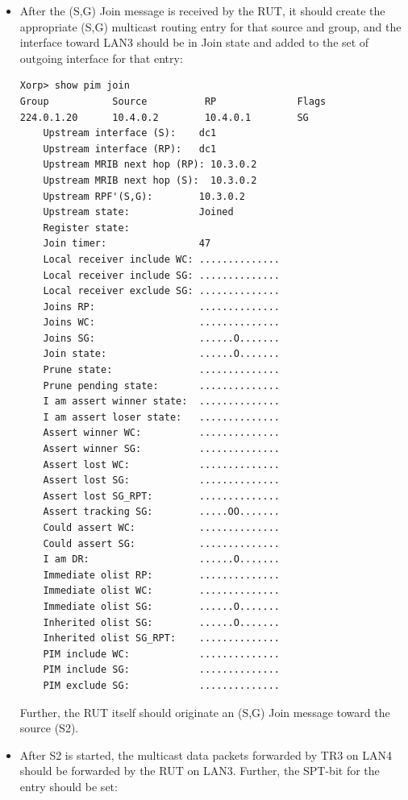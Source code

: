 \documentclass[11pt]{report}
\begin{document}
\begin{itemize}

  \item After the (S,G) Join message is received by the RUT, it
  should create the appropriate (S,G) multicast routing entry for
  that source and group, and the interface toward LAN3 should be in Join state
  and added to the set of outgoing interface for that entry:

\begin{verbatim}
Xorp> show pim join 
Group           Source          RP              Flags
224.0.1.20      10.4.0.2        10.4.0.1        SG   
    Upstream interface (S):    dc1
    Upstream interface (RP):   dc1
    Upstream MRIB next hop (RP): 10.3.0.2
    Upstream MRIB next hop (S):  10.3.0.2
    Upstream RPF'(S,G):        10.3.0.2
    Upstream state:            Joined 
    Register state:            
    Join timer:                47
    Local receiver include WC: ..............
    Local receiver include SG: ..............
    Local receiver exclude SG: ..............
    Joins RP:                  ..............
    Joins WC:                  ..............
    Joins SG:                  ......O.......
    Join state:                ......O.......
    Prune state:               ..............
    Prune pending state:       ..............
    I am assert winner state:  ..............
    I am assert loser state:   ..............
    Assert winner WC:          ..............
    Assert winner SG:          ..............
    Assert lost WC:            ..............
    Assert lost SG:            ..............
    Assert lost SG_RPT:        ..............
    Assert tracking SG:        .....OO.......
    Could assert WC:           ..............
    Could assert SG:           ..............
    I am DR:                   ......O.......
    Immediate olist RP:        ..............
    Immediate olist WC:        ..............
    Immediate olist SG:        ......O.......
    Inherited olist SG:        ......O.......
    Inherited olist SG_RPT:    ..............
    PIM include WC:            ..............
    PIM include SG:            ..............
    PIM exclude SG:            ..............
\end{verbatim}

  Further, the RUT itself should originate an (S,G) Join message
  toward the source (S2).

  \item After S2 is started, the multicast data packets forwarded by TR3
  on LAN4 should be forwarded by the RUT on LAN3. Further, the SPT-bit for the
  entry should be set:


\end{itemize}
\end{document}
